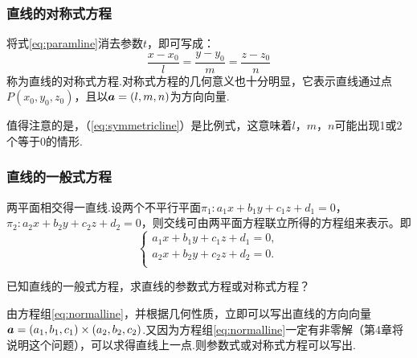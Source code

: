 \subsubsection*{直线的对称式方程}
\par 将式\ref{eq:paramline}消去参数$t$，即可写成：
\begin{equation}\label{eq:symmetricline}
  \frac{x-x_0}{l}=\frac{y-y_0}{m}=\frac{z-z_0}{n}
\end{equation}
称为直线的对称式方程.对称式方程的几何意义也十分明显，它表示直线通过点$P(x_0,y_0,z_0)$，且以$\vb*{a}=(l,m,n)$为方向向量.
\begin{remark}
  值得注意的是，（\ref{eq:symmetricline}）是比例式，这意味着$l$，$m$，$n$可能出现1或2个等于0的情形.
\end{remark}
\subsubsection*{直线的一般式方程}
\par 两平面相交得一直线.设两个不平行平面$\pi_1:a_1x+b_1y+c_1z+d_1=0$，$\pi_2:a_2x+b_2y+c_2z+d_2=0$，则交线可由两平面方程联立所得的方程组来表示。即
\begin{equation}\label{eq:normalline}
  \begin{cases}
    a_1x+b_1y+c_1z+d_1=0, \\
    a_2x+b_2y+c_2z+d_2=0. \\
  \end{cases}
\end{equation}
\begin{example}
  已知直线的一般式方程，求直线的参数式方程或对称式方程？
  \begin{solution}
    由方程组\ref{eq:normalline}，并根据几何性质，立即可以写出直线的方向向量$\vb*{a}=(a_1,b_1,c_1) \times (a_2,b_2,c_2)$.又因为方程组\ref{eq:normalline}一定有非零解（第4章将说明这个问题），可以求得直线上一点.则参数式或对称式方程可以写出.
  \end{solution}
\end{example}

